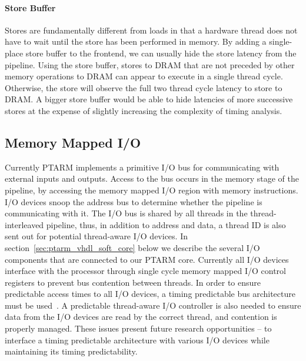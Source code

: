 \paragraph{Store Buffer}
\label{sec:ptarm_dram_store_buffer}
Stores are fundamentally different from loads in that a hardware thread does not have to wait until the store has been performed in memory.
By adding a single-place store buffer to the frontend, we can usually hide the store latency from the pipeline.
Using the store buffer, stores to DRAM that are not preceded by other memory operations to DRAM can appear to execute in a single thread cycle.
Otherwise, the store will observe the full two thread cycle latency to store to DRAM.
A bigger store buffer would be able to hide latencies of more successive stores at the expense of slightly increasing the complexity of timing analysis.

\subsection{Memory Mapped I/O}
Currently PTARM implements a primitive I/O bus for communicating with external inputs and outputs.
Access to the bus occurs in the memory stage of the pipeline, by accessing the memory mapped I/O region with memory instructions.
I/O devices snoop the address bus to determine whether the pipeline is communicating with it.
The I/O bus is shared by all threads in the thread-interleaved pipeline, thus, in addition to address and data, a thread ID is also sent out for potential thread-aware I/O devices. 
In section~\ref{sec:ptarm_vhdl_soft_core} below we describe the several I/O components that are connected to our PTARM core.
Currently all I/O devices interface with the processor through single cycle memory mapped I/O control registers to prevent bus contention between threads.
In order to ensure predictable access times to all I/O devices, a timing predictable bus architecture must be used~\cite{Wilhelm_future_arch_09}.   
A predictable thread-aware I/O controller is also needed to ensure data from the I/O devices are read by the correct thread, and contention is properly managed.
These issues present future research opportunities -- to interface a timing predictable architecture with various I/O devices while maintaining its timing predictability.  

